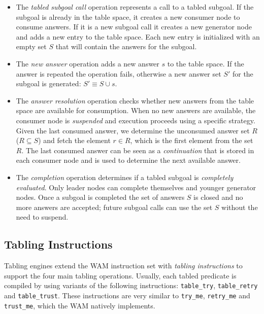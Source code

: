\begin{itemize}
  \item The \textit{tabled subgoal call} operation represents a call to a tabled subgoal.
  If the subgoal is already in the table space, it creates a new consumer node to consume answers.
  If it is a new subgoal call it creates a new generator node and adds a new entry to the table space.
  Each new entry is initialized with an empty set $S$ that will contain the answers for the subgoal. 
  
  \item The \textit{new answer} operation adds a new answer $s$ to the table space. If the answer is repeated the operation fails,
  otherwise a new answer set $S'$ for the subgoal is generated: $S' \equiv S \cup {s}$.
  
  \item The \textit{answer resolution} operation checks whether new answers from the table space are available for consumption.
  When no new answers are available, the consumer node is \textit{suspended} and execution proceeds using a specific strategy.
  Given the last consumed answer, we determine the unconsumed answer
  set $R$ ($R \subseteq S$) and fetch the element $r \in R$, which is the first element from the set $R$. The last consumed answer
  can be seen as a \textit{continuation} that is stored in each consumer node and is used to determine the next available answer.
  
  \item The \textit{completion} operation determines if a tabled subgoal is \textit{completely evaluated}.
  Only leader nodes can complete themselves and younger generator nodes.
  Once a subgoal is completed the set of answers $S$ is closed and no more answers are accepted; future subgoal calls
  can use the set $S$ without the need to suspend.
\end{itemize}

\subsection{Tabling Instructions}

Tabling engines extend the WAM instruction set with \textit{tabling instructions} to support the four
main tabling operations. Usually, each tabled predicate is compiled by using
variants of the following instructions:
\texttt{table\_try}, \texttt{table\_retry} and \texttt{table\_trust}. These instructions
are very similar to \texttt{try\_me}, \texttt{retry\_me} and
\texttt{trust\_me}, which the WAM natively implements. 

